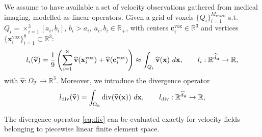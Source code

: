 We assume to have available a set of velocity observations gathered from medical imaging, modelled as linear operators. Given a grid of voxels $\{Q_i\}_{i=1}^{M_{\text{voxels}}}$ s.t. $Q_i=\times_{i=1}^3 [a_i, b_i]$, $b_i>a_i,\ a_i,b_i\in\mathbb{R}_+$, with centers $\mathbf{c}^{\text{vox}}_i\in\mathbb{R}^3$ and vertices $\{\mathbf{x}_i^{\text{vox}}\}_{i=1}^8\subset\mathbb{R}^3$:
\begin{equation}
  \label{eq:voxel}
  l_i(\widehat{\mathbf{v}}) = \frac{1}{9}\left(\sum_{i=1}^{8}\widehat{\mathbf{v}}(\mathbf{x}^{\text{vox}}_i)+\widehat{\mathbf{v}}(\mathbf{c}^{\text{vox}}_i)\right)\approx \int_{Q_i}\widehat{\mathbf{v}}(\mathbf{x})\ d\mathbf{x},\qquad l_i:\mathbb{R}^{\widehat{d}_{\mathbf u}}\rightarrow\mathbb{R},
\end{equation}
with $\widehat{\mathbf{v}}:\Omega_{\mathcal{T}}\rightarrow\mathbb{R}^3$. Moreover, we introduce the divergence operator
\begin{equation}
  \label{eq:div}
  l_{\text{div}}(\widehat{\mathbf{v}})=\int_{\Omega_h}\text{div}(\widehat{\mathbf{v}}(\x))\ d\x,\qquad l_{\text{div}}:\mathbb{R}^{\widehat{d}_{\mathbf u}}\rightarrow\mathbb{R},
\end{equation}

\begin{rmk}
  The divergence operator \eqref{eq:div} can be evaluated exactly for velocity fields belonging to piecewise linear finite element space.
\end{rmk}


